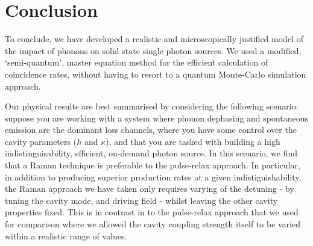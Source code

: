\section{Conclusion}

To conclude, we have developed a realistic and microscopically justified model of the impact of phonons on solid state single photon sources. We used a modified, `semi-quantum', master equation method for the efficient calculation of coincidence rates, without having to resort to a quantum Monte-Carlo simulation approach.

Our physical results are best summarised by considering the following scenario: suppose you are working with a system where phonon dephasing and spontaneous emission are the dominant loss channels, where you have some control over the cavity parameters ($h$ and $\kappa$), and that you are tasked with building a high indistinguisability, efficient, on-demand photon source. In this scenario, we find that a Raman technique is preferable to the pulse-relax approach. In particular, in addition to producing superior production rates at a given indistiguishability, the Raman approach we have taken only requires varying of the detuning - by tuning the cavity mode, and driving field - whilst leaving the other cavity properties fixed. This is in contrast in to the pulse-relax approach that we used for comparison where we allowed the cavity coupling strength itself to be varied within a realistic range of values. 



